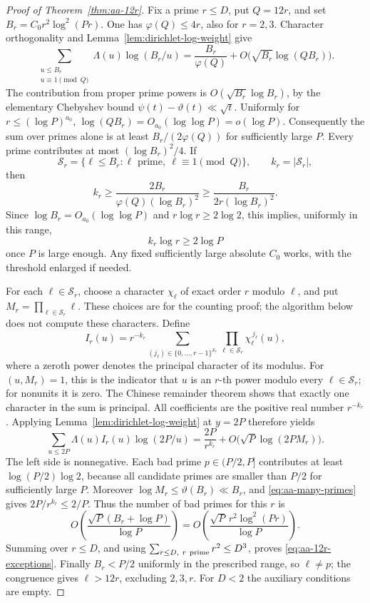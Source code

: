 \documentclass[11pt]{article}
\theoremstyle{definition}
\theoremstyle{remark}
\begin{document}
\begin{proof}[Proof of Theorem~\ref{thm:aa-12r}]
Fix a prime \(r\leq D\), put \(Q=12r\), and set
\(B_r=C_0r^2\log^2(Pr)\).
One has \(\varphi(Q)\leq4r\), also for \(r=2,3\).
Character orthogonality and Lemma~\ref{lem:dirichlet-log-weight} give
\[
 \sum_{\substack{u\leq B_r\\u\equiv1\pmod Q}}
       \Lambda(u)\log(B_r/u)
 =\frac{B_r}{\varphi(Q)}
       +O\bigl(\sqrt{B_r}\log(QB_r)\bigr).
\]
The contribution from proper prime powers is
\(O(\sqrt{B_r}\log B_r)\), by the elementary Chebyshev bound
\(\psi(t)-\vartheta(t)\ll\sqrt t\).
Uniformly for \(r\leq(\log P)^{a_0}\),
\(\log(QB_r)=O_{a_0}(\log\log P)=o(\log P)\).
Consequently the sum over primes alone is at least
\(B_r/(2\varphi(Q))\) for sufficiently large \(P\).
Every prime contributes at most \((\log B_r)^2/4\). If
\[
 \mathcal S_r=\{\ell\leq B_r:\ell\text{ prime},\
                                  \ell\equiv1\pmod Q\},
 \qquad k_r=|\mathcal S_r|,
\]
then
\[
 k_r\geq\frac{2B_r}{\varphi(Q)(\log B_r)^2}
       \geq\frac{B_r}{2r(\log B_r)^2}.
\]
Since \(\log B_r=O_{a_0}(\log\log P)\) and
\(r\log r\geq2\log2\), this implies, uniformly in this range,
\begin{equation}\label{eq:aa-many-primes}
 k_r\log r\geq2\log P
\end{equation}
once \(P\) is large enough. Any fixed sufficiently large absolute
\(C_0\) works, with the threshold enlarged if needed.

For each \(\ell\in\mathcal S_r\), choose a character
\(\chi_\ell\) of exact order \(r\) modulo \(\ell\), and put
\(M_r=\prod_{\ell\in\mathcal S_r}\ell\).
These choices are for the counting proof; the algorithm below
does not compute these characters. Define
\[
 I_r(u)=r^{-k_r}
   \sum_{(j_\ell)\in\{0,\ldots,r-1\}^{\mathcal S_r}}
       \prod_{\ell\in\mathcal S_r}\chi_\ell^{\,j_\ell}(u),
\]
where a zeroth power denotes the principal character of its modulus.
For \((u,M_r)=1\), this is the indicator that \(u\) is an \(r\)-th
power modulo every \(\ell\in\mathcal S_r\); for nonunits it is zero.
The Chinese remainder theorem shows that exactly one character
in the sum is principal. All coefficients are the positive real
number \(r^{-k_r}\). Applying Lemma~\ref{lem:dirichlet-log-weight} at
\(y=2P\) therefore yields
\[
 \sum_{u\leq2P}\Lambda(u)I_r(u)\log(2P/u)
 =\frac{2P}{r^{k_r}}
       +O\bigl(\sqrt P\log(2PM_r)\bigr).
\]
The left side is nonnegative. Each bad prime
\(p\in(P/2,P]\) contributes at least
\(\log(P/2)\log2\), because all candidate primes are smaller than
\(P/2\) for sufficiently large \(P\).
Moreover
\(\log M_r\leq\vartheta(B_r)\ll B_r\), and
\eqref{eq:aa-many-primes} gives \(2P/r^{k_r}\leq2/P\).
Thus the number of bad primes for this \(r\) is
\[
 O\!\left(
 \frac{\sqrt P(B_r+\log P)}{\log P}\right)
 =
 O\!\left(
 \frac{\sqrt P\,r^2\log^2(Pr)}{\log P}\right).
\]
Summing over \(r\leq D\), and using
\(\sum_{r\leq D,\ r\ {\rm prime}}r^2\leq D^3\), proves
\eqref{eq:aa-12r-exceptions}.
Finally \(B_r<P/2\) uniformly in the prescribed range, so
\(\ell\ne p\); the congruence gives \(\ell>12r\), excluding
\(2,3,r\). For \(D<2\) the auxiliary conditions are empty.
\end{proof}
\end{document}
